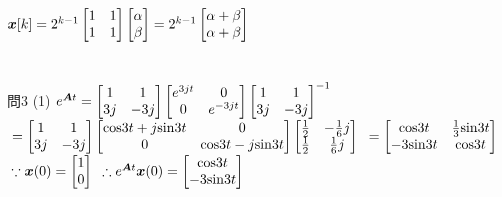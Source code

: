 \documentclass[12pt,a4paper]{article}
\begin{document}
$\\\bm{x}[k]=2^{k-1}
\begin{bmatrix}
1 & 1\\
1 & 1
\end{bmatrix}
\begin{bmatrix}
\alpha\\
\beta
\end{bmatrix}=2^{k-1}
\begin{bmatrix}
\alpha+\beta\\
\alpha+\beta
\end{bmatrix}$
\\
\\
\\
問3 (1)
$\\e^{\bm{A}t}=
\begin{bmatrix}
1 & 1\\
3j & -3j
\end{bmatrix}
\begin{bmatrix}
e^{3jt} & 0\\
0 & e^{-3jt}
\end{bmatrix}
\begin{bmatrix}
1 & 1\\
3j & -3j
\end{bmatrix}^{-1}$
$\\=
\begin{bmatrix}
1 & 1\\
3j & -3j
\end{bmatrix}
\begin{bmatrix}
\mathrm{cos}3t+j\mathrm{sin}3t & 0\\
0 & \mathrm{cos}3t-j\mathrm{sin}3t
\end{bmatrix}
\begin{bmatrix}
\frac{1}{2} & -\frac{1}{6}j\\
\frac{1}{2} & \frac{1}{6}j
\end{bmatrix}$
$\\=
\begin{bmatrix}
\mathrm{cos}3t & \frac{1}{3}\mathrm{sin}3t\\
-3\mathrm{sin}3t & \mathrm{cos}3t
\end{bmatrix}$
$\\\because \bm{x}(0)=
\begin{bmatrix}
1\\
0
\end{bmatrix}$
$\\\therefore e^{\bm{A}t}\bm{x}(0)=
\begin{bmatrix}
\mathrm{cos}3t\\
-3\mathrm{sin}3t
\end{bmatrix}$
\end{document}
